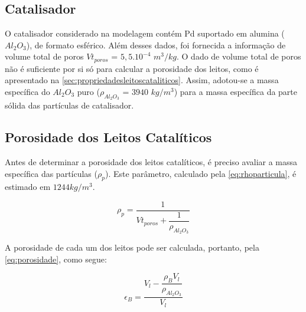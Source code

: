 
\subsection{Catalisador} \label{sec:catalisador}

O catalisador considerado na modelagem contém Pd suportado em alumina
($Al_2O_3$), de formato esférico. Além desses dados, foi fornecida a informação
de volume total de poros $Vt_{poros}$ = $5,5.10^{-4}$ $m^3/kg$. O dado de volume
total de poros não é suficiente por si só para calcular a porosidade dos leitos,
como é apresentado na \autoref{sec:propriedadesleitoscataliticos}. Assim,
adotou-se a massa específica do $Al_2O_3$ puro ($\rho_{Al_2O_3}$ = $3940$
$kg/m^3$) para a massa específica da parte sólida das partículas de catalisador.


\subsection{Porosidade dos Leitos Catalíticos}
\label{sec:propriedadesleitoscataliticos}

Antes de determinar a porosidade dos leitos catalíticos, é preciso avaliar a
massa específica das partículas ($\rho_{p}$). Este parâmetro, calculado pela
\autoref{eq:rhoparticula}, é estimado em $1244 kg/m^3$.

\begin{equation}
\rho_{p} = \dfrac{1}{Vt_{poros}+\dfrac{1}{\rho_{Al_2O_3}}}
\label{eq:rhoparticula}
\end{equation}


A porosidade de cada um dos leitos pode ser calculada, portanto, pela
\autoref{eq:porosidade}, como segue:

\begin{equation}
\epsilon_{B} = \dfrac{V_{l}-\dfrac{\rho_{B}V_l}{\rho_{Al_2O_3}}}{V_l}
\label{eq:porosidade}
\end{equation}

